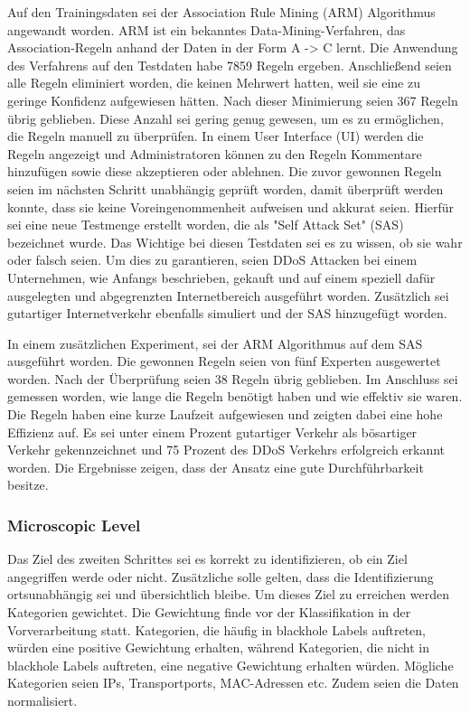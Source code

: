 \documentclass[sigplan,screen]{acmart}
\begin{document}
Auf den Trainingsdaten sei der Association Rule Mining (ARM) Algorithmus angewandt worden. ARM ist ein bekanntes Data-Mining-Verfahren, das Association-Regeln anhand der Daten in der Form A -> C lernt. Die Anwendung des Verfahrens auf den Testdaten habe 7859 Regeln ergeben. Anschließend seien alle Regeln eliminiert worden, die keinen Mehrwert hatten, weil sie eine zu geringe Konfidenz aufgewiesen hätten. Nach dieser Minimierung seien 367 Regeln übrig geblieben. Diese Anzahl sei gering genug gewesen, um es zu ermöglichen, die Regeln manuell zu überprüfen. In einem User Interface (UI) werden die Regeln angezeigt und Administratoren können zu den Regeln Kommentare hinzufügen sowie diese akzeptieren oder ablehnen.
Die zuvor gewonnen Regeln seien im nächsten Schritt unabhängig geprüft worden, damit überprüft werden konnte, dass sie keine Voreingenommenheit aufweisen und akkurat seien. Hierfür sei eine neue Testmenge erstellt worden, die als "Self Attack Set" (SAS) bezeichnet wurde. Das Wichtige bei diesen Testdaten sei es zu wissen, ob sie wahr oder falsch seien. Um dies zu garantieren, seien DDoS Attacken bei einem Unternehmen, wie Anfangs beschrieben, gekauft und auf einem speziell dafür ausgelegten und abgegrenzten Internetbereich ausgeführt worden. Zusätzlich sei gutartiger Internetverkehr ebenfalls simuliert und der SAS hinzugefügt worden.


In einem zusätzlichen Experiment, sei der ARM Algorithmus auf dem SAS ausgeführt worden. Die gewonnen Regeln seien von fünf Experten ausgewertet worden. Nach der Überprüfung seien 38 Regeln übrig geblieben. Im Anschluss sei gemessen worden, wie lange die Regeln benötigt haben und wie effektiv sie waren. Die Regeln haben eine kurze Laufzeit aufgewiesen und zeigten dabei eine hohe Effizienz auf. Es sei unter einem Prozent gutartiger Verkehr als bösartiger Verkehr gekennzeichnet und 75 Prozent des DDoS Verkehrs erfolgreich erkannt worden. Die Ergebnisse zeigen, dass der Ansatz eine gute Durchführbarkeit besitze.

\subsubsection{Microscopic Level}
Das Ziel des zweiten Schrittes sei es korrekt zu identifizieren, ob ein Ziel angegriffen werde oder nicht. Zusätzliche solle gelten, dass die Identifizierung ortsunabhängig sei und übersichtlich bleibe. Um dieses Ziel zu erreichen werden Kategorien gewichtet. Die Gewichtung finde vor der Klassifikation in der Vorverarbeitung statt. Kategorien, die häufig in blackhole Labels auftreten, würden eine positive Gewichtung erhalten, während Kategorien, die nicht in blackhole Labels auftreten, eine negative Gewichtung erhalten würden. Mögliche Kategorien seien IPs, Transportports, MAC-Adressen etc. Zudem seien die Daten normalisiert.
\end{document}

